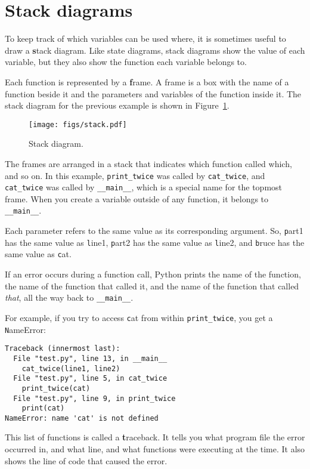 \documentclass[
DIV=11,
fontsize=12,
twoside,
headinclude=false,
titlepage=firstiscover,
abstract=true,
headsepline=true,
footsepline=true,
chapterprefix=true, %
headings=big,
bibliography=totoc,%
captions=tableheading
]{scrbook}
\theoremstyle{definition}
\begin{document}
\section{Stack diagrams}
\label{stackdiagram}

To keep track of which variables can be used where, it is sometimes
useful to draw a {\textbf stack diagram}.  Like state diagrams, stack
diagrams show the value of each variable, but they also show the
function each variable belongs to.

Each function is represented by a {\textbf frame}.  A frame is a box with
the name of a function beside it and the parameters and variables of
the function inside it.  The stack diagram for the previous example is
shown in Figure~\ref{fig.stack}.

\begin{figure}
\centerline
{\texttt{[image: figs/stack.pdf]}}
\caption{Stack diagram.}
\label{fig.stack}
\end{figure}


The frames are arranged in a stack that indicates which function
called which, and so on.  In this example, \verb"print_twice"
was called by \verb"cat_twice", and \verb"cat_twice" was called by 
\verb"__main__", which is a special name for the topmost frame.  When
you create a variable outside of any function, it belongs to 
\verb"__main__".


Each parameter refers to the same value as its corresponding
argument.  So, {\texttt part1} has the same value as
{\texttt line1}, {\texttt part2} has the same value as {\texttt line2},
and {\texttt bruce} has the same value as {\texttt cat}.

If an error occurs during a function call, Python prints the
name of the function, the name of the function that called
it, and the name of the function that called {\em that}, all the
way back to \verb"__main__".

For example, if you try to access {\texttt cat} from within 
\verb"print_twice", you get a {\texttt NameError}:

\begin{lstlisting}
Traceback (innermost last):
  File "test.py", line 13, in __main__
    cat_twice(line1, line2)
  File "test.py", line 5, in cat_twice
    print_twice(cat)
  File "test.py", line 9, in print_twice
    print(cat)
NameError: name 'cat' is not defined
\end{lstlisting}
%
This list of functions is called a {\textbf traceback}.  It tells you what
program file the error occurred in, and what line, and what functions
were executing at the time.  It also shows the line of code that
caused the error.
\end{document}
